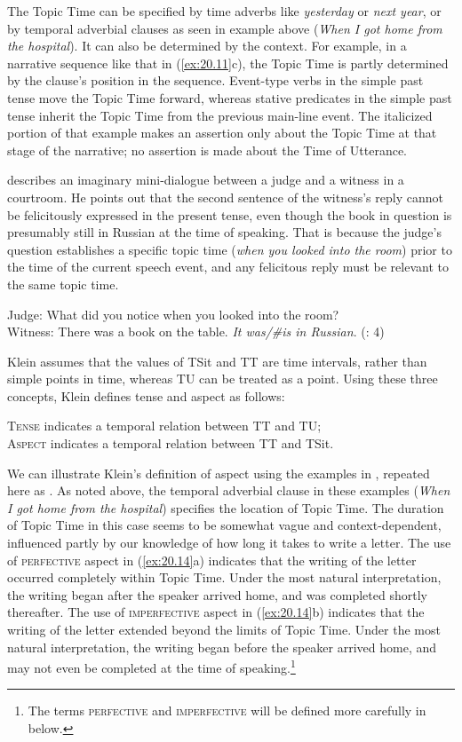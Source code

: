 The Topic Time can be specified by time adverbs like \textit{yesterday} or \textit{next year}, or by temporal adverbial clauses as seen in example  above (\textit{When I got home from the hospital}). It can also be determined by the context. For example, in a narrative sequence like that in (\ref{ex:20.11}c), the Topic Time is partly determined by the clause’s position in the sequence. Event-type verbs in the simple past tense move the Topic Time forward, whereas stative predicates in the simple past tense inherit the Topic Time from the previous main-line event. The italicized portion of that example makes an assertion only about the Topic Time at that stage of the narrative; no assertion is made about the Time of Utterance.



\citet[4]{Klein1994} describes an imaginary mini-dialogue between a judge and a witness in a courtroom. He points out that the second sentence of the witness’s reply cannot be felicitously expressed in the present tense, even though the book in question is presumably still in Russian at the time of speaking. That is because the judge’s question establishes a specific topic time (\textit{when you looked into the room}) prior to the time of the current speech event, and any felicitous reply must be relevant to the same topic time.


\ea \label{ex:20.12}
Judge: What did you notice when you looked into the room?\\
Witness: There was a book on the table. \textit{It was/\#is in Russian}.   (\citealt{Klein1994}: 4)
\z


Klein assumes that the values of TSit and TT are time intervals, rather than simple points in time, whereas TU can be treated as a point. Using these three concepts, Klein defines tense and aspect as follows:


\ea \label{ex:20.13}
\ea  \textsc{Tense} indicates a temporal relation between TT and TU;\\
\ex \textsc{Aspect} indicates a temporal relation between TT and TSit.
\z \z


We can illustrate Klein’s definition of aspect using the examples in , repeated here as . As noted above, the temporal adverbial clause in these examples (\textit{When I got home from the hospital}) specifies the location of Topic Time. The duration of Topic Time in this case seems to be somewhat vague and context-dependent, influenced partly by our knowledge of how long it takes to write a letter. The use of \textsc{perfective} aspect in (\ref{ex:20.14}a) indicates that the writing of the letter occurred completely within Topic Time. Under the most natural interpretation, the writing began after the speaker arrived home, and was completed shortly thereafter. The use of \textsc{imperfective} aspect in (\ref{ex:20.14}b) indicates that the writing of the letter extended beyond the limits of Topic Time. Under the most natural interpretation, the writing began before the speaker arrived home, and may not even be completed at the time of speaking.\footnote{The terms \textsc{perfective} and \textsc{imperfective} will be defined more carefully in  below.}


